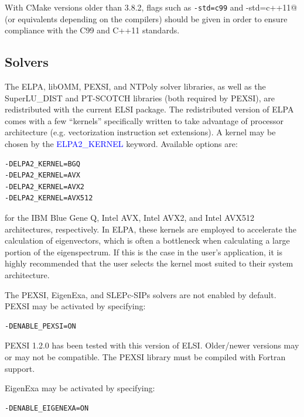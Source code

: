 \documentclass{report}
\begin{document}
With CMake versions older than 3.8.2, flags such as \verb+-std=c99+ and \verb@-std=c++11@ (or equivalents depending on the compilers) should be given in order to ensure compliance with the C99 and C++11 standards.

\subsection{Solvers}
\label{subsec:config_solvers}
The ELPA, libOMM, PEXSI, and NTPoly solver libraries, as well as the SuperLU\_DIST and PT-SCOTCH libraries (both required by PEXSI), are redistributed with the current ELSI package. The redistributed version of ELPA comes with a few ``kernels'' specifically written to take advantage of processor architecture (e.g. vectorization instruction set extensions). A kernel may be chosen by the \textcolor{blue}{ELPA2\_KERNEL} keyword. Available options are:
\begin{tcolorbox}
\begin{verbatim}
-DELPA2_KERNEL=BGQ
-DELPA2_KERNEL=AVX
-DELPA2_KERNEL=AVX2
-DELPA2_KERNEL=AVX512
\end{verbatim}
\end{tcolorbox}

for the IBM Blue Gene Q, Intel AVX, Intel AVX2, and Intel AVX512 architectures, respectively. In ELPA, these kernels are employed to accelerate the calculation of eigenvectors, which is often a bottleneck when calculating a large portion of the eigenspectrum. If this is the case in the user's application, it is highly recommended that the user selects the kernel most suited to their system architecture.

The PEXSI, EigenExa, and SLEPc-SIPs solvers are not enabled by default. PEXSI may be activated by specifying:
\begin{tcolorbox}
\begin{verbatim}
-DENABLE_PEXSI=ON
\end{verbatim}
\end{tcolorbox}

PEXSI 1.2.0 has been tested with this version of ELSI. Older/newer versions may or may not be compatible. The PEXSI library must be compiled with Fortran support.

EigenExa may be activated by specifying:
\begin{tcolorbox}
\begin{verbatim}
-DENABLE_EIGENEXA=ON
\end{verbatim}
\end{tcolorbox}
\end{document}
